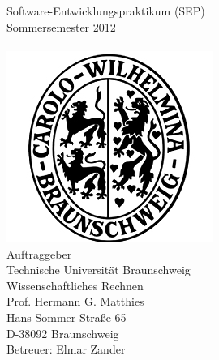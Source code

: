 

\thispagestyle{plain}      %

\begin{titlepage}

\begin{center}

{}\\[3ex]%

{}\\[3ex]%

Software-Entwicklungspraktikum (SEP)\\
Sommersemester 2012\\[4ex]%

{}\\[4ex]%

\includegraphics[scale=0.8]{bilder/carolo.jpg}\\[4ex]%

Auftraggeber\\
Technische Universität Braunschweig\\
Wissenschaftliches Rechnen\\
Prof. Hermann G. Matthies\\
Hans-Sommer-Straße 65\\
D-38092 Braunschweig\\[1ex]%
Betreuer: Elmar Zander\\[4ex]%


\end{center}
\end{titlepage}
